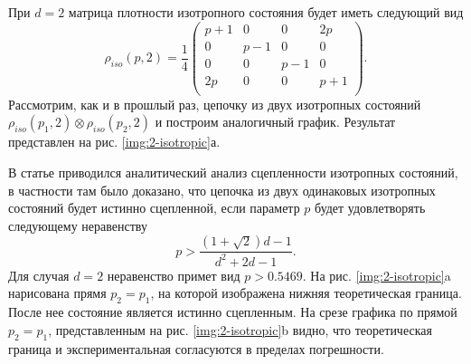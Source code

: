При $d=2$ матрица плотности изотропного состояния будет иметь следующий вид
\begin{equation}\label{isotropic-state-2dmatrix}
    \rho_{iso}(p, 2) = \frac{1}{4}
    \begin{pmatrix}
        p+1 & 0 & 0 & 2p \\
        0 & p-1 & 0 & 0 \\
        0 & 0 & p-1 & 0 \\
        2p & 0 & 0 & p+1 \\
    \end{pmatrix}.
\end{equation}
Рассмотрим, как и в прошлый раз, цепочку из двух изотропных состояний $\rho_{iso}(p_1,2) \otimes \rho_{iso}(p_2,2)$ и построим аналогичный график. Результат представлен на рис. \ref{img:2-isotropic}а.

В статье \cite{Contreras_Tejada_2022} приводился аналитический анализ сцепленности изотропных состояний, в частности там было доказано, что цепочка из двух одинаковых изотропных состояний будет истинно сцепленной, если параметр $p$ будет удовлетворять следующему неравенству
\begin{equation}\label{isotropic-bisep-analitic-bound}
    p > \frac{(1 + \sqrt{2})d - 1}{d^2 + 2d - 1}.
\end{equation}
Для случая $d=2$ неравенство примет вид $p > 0.5469$. На рис. \ref{img:2-isotropic}a нарисована прямя $p_2 = p_1$, на которой изображена нижняя теоретическая граница. После нее состояние является истинно сцепленным. На срезе графика по прямой $p_2 = p_1$, представленным на рис. \ref{img:2-isotropic}b видно, что теоретическая граница и экспериментальная согласуются в пределах погрешности.

